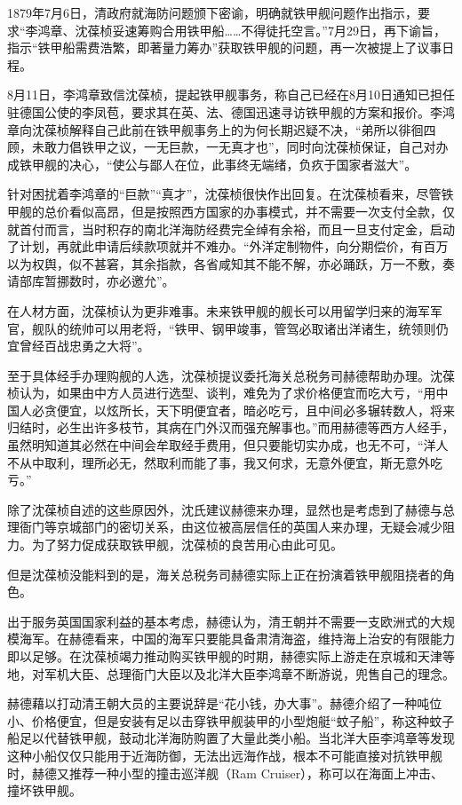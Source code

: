 \documentclass[12pt,UTF8]{ctexbook}
\begin{document}
1879年7月6日，清政府就海防问题颁下密谕，明确就铁甲舰问题作出指示，要求“李鸿章、沈葆桢妥速筹购合用铁甲船……不得徒托空言。”7月29日，再下谕旨，指示“铁甲船需费浩繁，即著量力筹办”获取铁甲舰的问题，再一次被提上了议事日程。

8月11日，李鸿章致信沈葆桢，提起铁甲舰事务，称自己已经在8月10日通知已担任驻德国公使的李凤苞，要求其在英、法、德国迅速寻访铁甲舰的方案和报价。李鸿章向沈葆桢解释自己此前在铁甲舰事务上的为何长期迟疑不决，“弟所以徘徊四顾，未敢力倡铁甲之议，一无巨款，一无真才也”，同时向沈葆桢保证，自己对办成铁甲舰的决心，“使公与鄙人在位，此事终无端绪，负疚于国家者滋大”。

针对困扰着李鸿章的“巨款”“真才”，沈葆桢很快作出回复。在沈葆桢看来，尽管铁甲舰的总价看似高昂，但是按照西方国家的办事模式，并不需要一次支付全款，仅就首付而言，当时积存的南北洋海防经费完全绰有余裕，而且一旦支付定金，启动了计划，再就此申请后续款项就并不难办。“外洋定制物件，向分期偿价，有百万以为权舆，似不甚窘，其余指款，各省咸知其不能不解，亦必踊跃，万一不敷，奏请部库暂挪数时，亦必邀允”。

在人材方面，沈葆桢认为更非难事。未来铁甲舰的舰长可以用留学归来的海军军官，舰队的统帅可以用老将，“铁甲、钢甲竣事，管驾必取诸出洋诸生，统领则仍宜曾经百战忠勇之大将”。

至于具体经手办理购舰的人选，沈葆桢提议委托海关总税务司赫德帮助办理。沈葆桢认为，如果由中方人员进行选型、谈判，难免为了求价格便宜而吃大亏，“用中国人必贪便宜，以炫所长，天下明便宜者，暗必吃亏，且中间必多辗转数人，将来归结时，必生出许多枝节，其病在门外汉而强充解事也。”而用赫德等西方人经手，虽然明知道其必然在中间会牟取经手费用，但只要能切实办成，也无不可，“洋人不从中取利，理所必无，然取利而能了事，我又何求，无意外便宜，斯无意外吃亏。”

除了沈葆桢自述的这些原因外，沈氏建议赫德来办理，显然也是考虑到了赫德与总理衙门等京城部门的密切关系，由这位被高层信任的英国人来办理，无疑会减少阻力。为了努力促成获取铁甲舰，沈葆桢的良苦用心由此可见。

但是沈葆桢没能料到的是，海关总税务司赫德实际上正在扮演着铁甲舰阻挠者的角色。

出于服务英国国家利益的基本考虑，赫德认为，清王朝并不需要一支欧洲式的大规模海军。在赫德看来，中国的海军只要能具备肃清海盗，维持海上治安的有限能力即以足够。在沈葆桢竭力推动购买铁甲舰的时期，赫德实际上游走在京城和天津等地，对军机大臣、总理衙门大臣以及北洋大臣李鸿章不断游说，兜售自己的理念。

赫德藉以打动清王朝大员的主要说辞是“花小钱，办大事”。赫德介绍了一种吨位小、价格便宜，但是安装有足以击穿铁甲舰装甲的小型炮艇“蚊子船”，称这种蚊子船足以代替铁甲舰，鼓动北洋海防购置了大量此类小船。当北洋大臣李鸿章等发现这种小船仅仅只能用于近海防御，无法出远海作战，根本不可能直接对抗铁甲舰时，赫德又推荐一种小型的撞击巡洋舰（Ram Cruiser），称可以在海面上冲击、撞坏铁甲舰。
\end{document}
